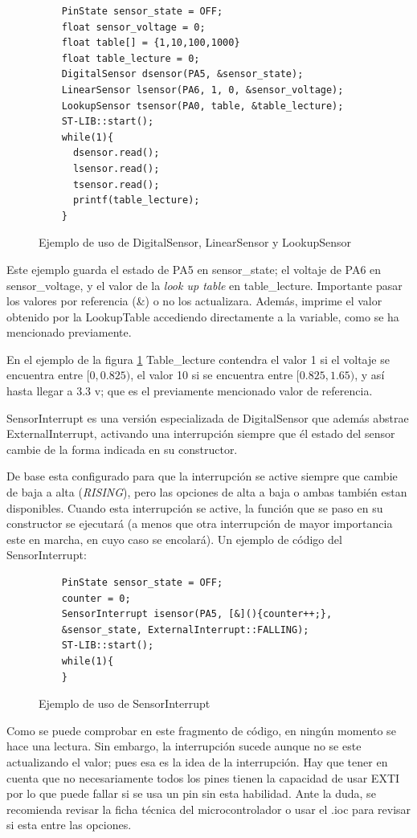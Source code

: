 \documentclass{report}
\begin{document}
\begin{figure}[H]
  \begin{lstlisting}
    PinState sensor_state = OFF;
    float sensor_voltage = 0;
    float table[] = {1,10,100,1000}
    float table_lecture = 0;
    DigitalSensor dsensor(PA5, &sensor_state);
    LinearSensor lsensor(PA6, 1, 0, &sensor_voltage);
    LookupSensor tsensor(PA0, table, &table_lecture);
    ST-LIB::start();
    while(1){
      dsensor.read();
      lsensor.read();
      tsensor.read();
      printf(table_lecture);
    }
  \end{lstlisting}
  \caption{Ejemplo de uso de DigitalSensor, LinearSensor y LookupSensor}
  \label{SensorsCode}
\end{figure}
\par \vspace{0.3cm}
Este ejemplo guarda el estado de PA5 en sensor\_state; el voltaje de PA6 en sensor\_voltage, y el valor de la \textit{look up table} en table\_lecture. Importante pasar los valores por referencia (\&) o no los actualizara. Además, imprime el valor obtenido por la LookupTable accediendo directamente a la variable, como se ha mencionado previamente. \par
En el ejemplo de la figura \ref{SensorsCode} Table\_lecture contendra el valor 1 si el voltaje se encuentra entre $[0, 0.825)$, el valor 10 si se encuentra entre $[0.825, 1.65)$, y así hasta llegar a 3.3 v; que es el previamente mencionado valor de referencia. 
\par \vspace{0.3cm}
SensorInterrupt es una versión especializada de DigitalSensor que además abstrae ExternalInterrupt, activando una interrupción siempre que él estado del sensor cambie de la forma indicada en su constructor. \par 
De base esta configurado para que la interrupción se active siempre que cambie de baja a alta (\textit{RISING}), pero las opciones de alta a baja o ambas también estan disponibles. Cuando esta interrupción se active, la función que se paso en su constructor se ejecutará (a menos que otra interrupción de mayor importancia este en marcha, en cuyo caso se encolará).
Un ejemplo de código del SensorInterrupt:
\begin{figure}[H]
  \begin{lstlisting}
    PinState sensor_state = OFF;
    counter = 0;
    SensorInterrupt isensor(PA5, [&](){counter++;}, 
    &sensor_state, ExternalInterrupt::FALLING);
    ST-LIB::start();
    while(1){
    }
  \end{lstlisting}
  \caption{Ejemplo de uso de SensorInterrupt}
  \label{SensorInterruptCode}
\end{figure}
\par \vspace{0.3cm}
Como se puede comprobar en este fragmento de código, en ningún momento se hace una lectura. Sin embargo, la interrupción sucede aunque no se este actualizando el valor; pues esa es la idea de la interrupción. Hay que tener en cuenta que no necesariamente todos los pines tienen la capacidad de usar EXTI por lo que puede fallar si se usa un pin sin esta habilidad. Ante la duda, se recomienda revisar la ficha técnica del microcontrolador o usar el .ioc para revisar si esta entre las opciones. 
\end{document}
